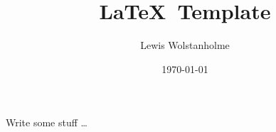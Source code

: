 \title{\LaTeX~Template}
\author{Lewis Wolstanholme}
\date{\getDate\today}
\maketitle

\noindent Write some stuff \dots